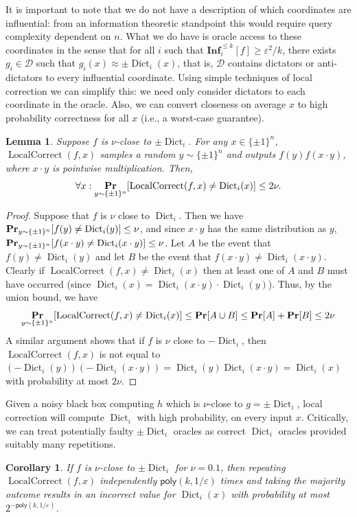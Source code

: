 \documentclass[10pt,a4paper]{article}
\providecommand{\poly}{\mathsf{poly}}
\theoremstyle{plain}
\newtheorem{corollary}[theorem]{Corollary}
\newtheorem{lemma}[theorem]{Lemma}
\theoremstyle{remark}
\theoremstyle{plain}
\renewcommand{\Pr}{\mathop{\bf Pr\/}}
\newcommand{\LocalCorrect}{\operatorname{LocalCorrect}}
\newcommand\Inf{{\mathbf{Inf}}}
\newcommand{\eps}{\varepsilon}
\newcommand{\pmone}{\{\pm 1\}}
\newcommand{\Dict}{\operatorname{Dict}}
\newcommand{\InfluentialOracles}{\mathcal{D}}
\newcommand{\BooleanHypercube}[1]{\{\pm 1\}^{#1}}
\renewcommand{\epsilon}{\varepsilon}
\begin{document}
It is important to note that we do not have a description of which coordinates are influential: from an information theoretic standpoint this would require query complexity dependent on $n$. What we do have is oracle access to these coordinates in the sense that for all $i$ such that $\Inf_i^{\leq k}[f] \geq \epsilon^2/k$, there exists $g_i \in \InfluentialOracles$
such that $g_i(x) \approx \pm \Dict_i(x)$, that is, $\InfluentialOracles$ contains dictators or anti-dictators to every influential coordinate. Using simple techniques of local correction we can simplify this: we need only consider dictators to each coordinate in the oracle. Also, we can convert closeness on average $x$ to high probability correctness for all $x$ (i.e., a worst-case guarantee).\begin{lemma}
\label{lemma:localcorrect}
Suppose $f$ is $\nu$-close to $\pm \Dict_i$. For any $x \in \BooleanHypercube{n}$, $\LocalCorrect(f, x)$ samples a random $y \sim \BooleanHypercube{n}$ and outputs $f(y)f(x\cdot y)$, where $x \cdot y$ is pointwise multiplication. Then,$$\forall{x}: \Pr_{y\sim \pmone^n}[\LocalCorrect(f,x) \neq \Dict_i(x)] \leq 2\nu.$$

\end{lemma}
\begin{proof}
Suppose that $f$ is $\nu$ close to $\Dict_i$. Then we have $\Pr_{y \sim \pmone^n}[f(y) \neq \Dict_i(y)] \leq \nu$, and since $x\cdot y$ has the same distribution as $y$, $\Pr_{y \sim \pmone^n}[f(x\cdot y) \neq \Dict_i(x \cdot y)] \leq \nu$. Let $A$ be the event that $f(y) \neq \Dict_i(y)$ and let $B$ be the event that $f(x\cdot y) \neq \Dict_i(x \cdot y)$. Clearly if $\LocalCorrect(f,x) \neq \Dict_i(x)$ then at least one of $A$ and $B$ must have occurred (since $\Dict_i(x) = \Dict_i(x\cdot y) \cdot \Dict_i(y)$). Thus, by the union bound, we have
$$
\Pr_{y \sim \pmone^n}[\LocalCorrect(f,x) \neq \Dict_i(x)]\leq \Pr[A \cup B] \leq \Pr[A] + \Pr[B] \leq 2\nu
$$
A similar argument shows that if $f$ is $\nu$ close to $-\Dict_i$, then $\LocalCorrect(f,x)$ is not equal to $(-\Dict_i(y))(-\Dict_i(x \cdot y)) = \Dict_i(y)\Dict_i(x \cdot y) = \Dict_i(x)$ with probability at most $2\nu$. 
\end{proof}

Given a noisy black box computing $h$ which is $\nu$-close to $g = \pm \Dict_i$, local correction will compute $\Dict_i$ with high probability, on every input $x$. Critically, we can treat potentially faulty $\pm \Dict_i$ oracles as correct $\Dict_i$ oracles provided suitably many repetitions.
\begin{corollary}
\label{corollary:localcorrect}
If $f$ is $\nu$-close to $\pm \Dict_i$ for $\nu=0.1$, then repeating $\LocalCorrect(f,x)$ independently $\poly(k,1/\eps)$ times and taking the majority outcome results in an incorrect value for $\Dict_i(x)$ with probability at most $2^{-\poly(k,1/\eps)}$.
\end{corollary}
\end{document}
